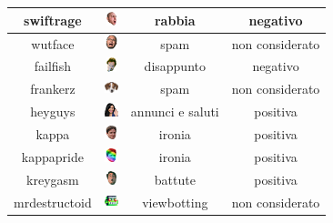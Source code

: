 \documentclass[a4paper,12pt,openright,twoside]{report}
\theoremstyle{definition}
\begin{document}
\begin{table}[H]
\begin{center}
\begin{tabular}{|c|c|c|c|}
\hline
swiftrage & \includegraphics[height=0.4cm, width=0.4cm]{Immagini/Emoticons/swiftrage.png} & rabbia & negativo \\
\hline
wutface & \includegraphics[height=0.4cm, width=0.4cm]{Immagini/Emoticons/wutface.png} & spam & non considerato \\
\hline
failfish & \includegraphics[height=0.4cm, width=0.4cm]{Immagini/Emoticons/failfish.png} & disappunto & negativo \\
\hline
frankerz & \includegraphics[height=0.4cm, width=0.4cm]{Immagini/Emoticons/frankerz.png} & spam & non considerato \\
\hline
heyguys & \includegraphics[height=0.4cm, width=0.4cm]{Immagini/Emoticons/heyguys.png} & annunci e saluti & positiva \\
\hline
kappa & \includegraphics[height=0.4cm, width=0.4cm]{Immagini/Emoticons/kappahd.png} & ironia & positiva \\
\hline
kappapride & \includegraphics[height=0.4cm, width=0.4cm]{Immagini/Emoticons/kappapride.png} & ironia & positiva \\
\hline
kreygasm & \includegraphics[height=0.4cm, width=0.4cm]{Immagini/Emoticons/kreygasm} & battute & positiva \\
\hline
mrdestructoid & \includegraphics[height=0.4cm, width=0.4cm]{Immagini/Emoticons/mrdestructoid.png} & viewbotting & non considerato \\

\end{tabular}
\end{center}
\end{table}
\end{document}
